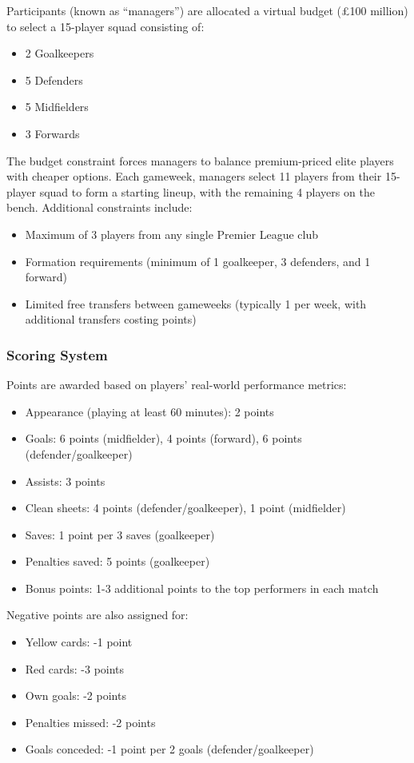 Participants (known as ``managers'') are allocated a virtual budget (£100 million) to select a 15-player squad consisting of:
\begin{itemize}
    \item 2 Goalkeepers
    \item 5 Defenders
    \item 5 Midfielders
    \item 3 Forwards
\end{itemize}

The budget constraint forces managers to balance premium-priced elite players with cheaper options. Each gameweek, managers select 11 players from their 15-player squad to form a starting lineup, with the remaining 4 players on the bench. Additional constraints include:
\begin{itemize}
    \item Maximum of 3 players from any single Premier League club
    \item Formation requirements (minimum of 1 goalkeeper, 3 defenders, and 1 forward)
    \item Limited free transfers between gameweeks (typically 1 per week, with additional transfers costing points) \cite{fpl2024rules}
\end{itemize}

\subsubsection{Scoring System}

Points are awarded based on players' real-world performance metrics:
\begin{itemize}
    \item Appearance (playing at least 60 minutes): 2 points
    \item Goals: 6 points (midfielder), 4 points (forward), 6 points (defender/goalkeeper)
    \item Assists: 3 points
    \item Clean sheets: 4 points (defender/goalkeeper), 1 point (midfielder)
    \item Saves: 1 point per 3 saves (goalkeeper)
    \item Penalties saved: 5 points (goalkeeper)
    \item Bonus points: 1-3 additional points to the top performers in each match
\end{itemize}

Negative points are also assigned for:
\begin{itemize}
    \item Yellow cards: -1 point
    \item Red cards: -3 points
    \item Own goals: -2 points
    \item Penalties missed: -2 points
    \item Goals conceded: -1 point per 2 goals (defender/goalkeeper) \cite{fpl2024rules}
\end{itemize}

